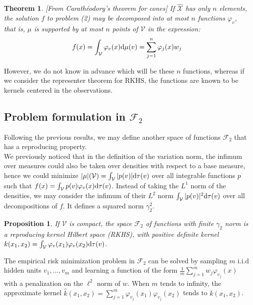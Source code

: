 \documentclass[a4paper, 11pt]{scrartcl}
\newtheorem{theorem}{Theorem}[section]
\newtheorem{proposition}{Proposition}[section]
\begin{document}
{\begin{theorem}{\emph{[From Carathéodory's theorem for cones]}} If $\mathcal{\hat X}$ has only $n$ elements, the solution $f$ to problem (2) may be decomposed into at most $n$ functions $\varphi_v$, that is, $\mu$ is supported by at most $n$ points of $\mathcal{V}$ in the expression: $$ f(x) = \int_\mathcal{V} \varphi_v(x) \textnormal{d}\mu(v) = \sum_{j=1}^n \varphi_j(x) w_j$$
\end{theorem}

However, we do not know in advance which will be these $n$ functions, whereas if we consider the representer theorem for RKHS, the functions are known to be kernels centered in the observations.


\subsection{Problem formulation in $\mathcal{F}_2$}

Following the previous results, we may define another space of functions $\mathcal{F}_2$ that has a reproducing property. \\

We previously noticed that in the definition of the variation norm, the infimum over measures could also be taken over densities with respect to a base measure, hence we could minimize $|\mu|(\mathcal{V}) = \int_\mathcal{V} |p(v)| \textnormal{d}\tau(v)$ over all integrable functions $p$ such that $f(x) = \int_\mathcal{V} p(v) \varphi_v(x)\textnormal{d}\tau(v)$. Instead of taking the $L^1$ norm of the densities, we may consider the infimum of their $L^2$ norm $\int_\mathcal{V} |p(v)|^2 \textnormal{d}\tau(v)$ over all decompositions of $f$. It defines a squared norm $\gamma_2^2$.


\begin{proposition}
If $\mathcal{V}$ is compact, the space $\mathcal{F}_2$ of functions with finite $\gamma_2$ norm is a reproducing kernel Hilbert space (RKHS), with positive definite kernel $k(x_1, x_2)=\int_\mathcal{V} \varphi_v(x_1) \varphi_v(x_2) \textnormal{d}\tau(v)$.
\end{proposition}

The empirical risk minimization problem in $\mathcal{F}_2$ can be solved by sampling $m$ i.i.d hidden units $v_1,...,v_m$ and learning a function of the form $\frac{1}{m} \sum_{j=1}^m w_j \varphi_{v_j}(x)$ with a penalization on the $\ell^2$ norm of $w$. When $m$ tends to infinity, the approximate kernel $\hat k(x_1, x_2) = \sum_{j=1}^m \varphi_{v_j}(x_1) \varphi_{v_j}(x_2)$ tends to $k(x_1, x_2)$.

}
\end{document}
